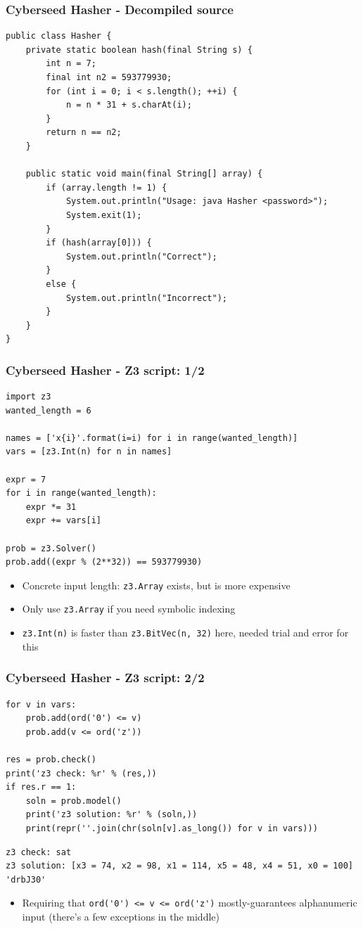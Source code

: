 \documentclass[aspectratio=169]{beamer}
\begin{document}
\begin{frame}[fragile]
\frametitle{Cyberseed Hasher - Decompiled source}
\begin{Verbatim}[fontsize=\scriptsize, frame=single]
public class Hasher {   
    private static boolean hash(final String s) {
        int n = 7;
        final int n2 = 593779930;
        for (int i = 0; i < s.length(); ++i) {
            n = n * 31 + s.charAt(i);
        }
        return n == n2;
    }

    public static void main(final String[] array) {
        if (array.length != 1) {
            System.out.println("Usage: java Hasher <password>");
            System.exit(1);
        }
        if (hash(array[0])) {
            System.out.println("Correct");
        }
        else {
            System.out.println("Incorrect");
        }
    }
}
\end{Verbatim}
\end{frame}

\begin{frame}[fragile]
\frametitle{Cyberseed Hasher - Z3 script: 1/2}
\begin{Verbatim}[fontsize=\scriptsize, frame=single]
import z3
wanted_length = 6

names = ['x{i}'.format(i=i) for i in range(wanted_length)]
vars = [z3.Int(n) for n in names]

expr = 7
for i in range(wanted_length):
    expr *= 31
    expr += vars[i]

prob = z3.Solver()
prob.add((expr % (2**32)) == 593779930)
\end{Verbatim}
\begin{itemize}
\item Concrete input length: \verb|z3.Array| exists, but is more expensive
\item Only use \verb|z3.Array| if you need symbolic indexing
\item \verb|z3.Int(n)| is faster than \verb|z3.BitVec(n, 32)| here, needed trial and error for this
\end{itemize}
\end{frame}

\begin{frame}[fragile]
\frametitle{Cyberseed Hasher - Z3 script: 2/2}
\begin{Verbatim}[fontsize=\scriptsize, frame=single]
for v in vars:
    prob.add(ord('0') <= v)
    prob.add(v <= ord('z'))

res = prob.check()
print('z3 check: %r' % (res,))
if res.r == 1:
    soln = prob.model()
    print('z3 solution: %r' % (soln,))
    print(repr(''.join(chr(soln[v].as_long()) for v in vars)))
\end{Verbatim}
\begin{Verbatim}[fontsize=\scriptsize, frame=single]
z3 check: sat
z3 solution: [x3 = 74, x2 = 98, x1 = 114, x5 = 48, x4 = 51, x0 = 100]
'drbJ30'
\end{Verbatim}
\begin{itemize}
\item Requiring that \verb|ord('0') <= v <= ord('z')| mostly-guarantees alphanumeric input (there's a few exceptions in the middle)
\end{itemize}
\end{frame}
\end{document}
